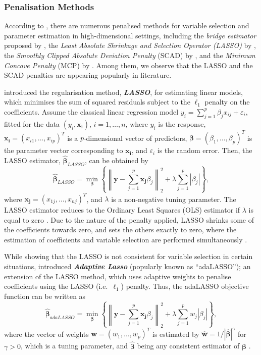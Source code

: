 \documentclass[11pt,a4paper,]{article}
\begin{document}
\hypertarget{penalisation-methods}{%
\subsubsection{Penalisation Methods}\label{penalisation-methods}}

According to \textcite{Huang2010}, there are numerous penalised methods
for variable selection and parameter estimation in high-dimensional
settings, including the \emph{bridge estimator} proposed by
\textcite{Frank1993}, the \emph{Least Absolute Shrinkage and Selection
Operator (LASSO)} by \textcite{Tibshirani1996}, the \emph{Smoothly
Clipped Absolute Deviation Penalty} (SCAD) by \textcite{Fan2001}, and
the \emph{Minimum Concave Penalty} (MCP) by \textcite{Zhang2010}. Among
them, we observe that the LASSO and the SCAD penalties are appearing
popularly in literature.

\textcite{Tibshirani1996} introduced the regularisation method,
\textbf{\emph{LASSO}}, for estimating linear models, which minimises the
sum of squared residuals subject to the \(\ell_{1}\) penalty on the
coefficients. Assume the classical linear regression model
\(y_{i} = \sum_{j=1}^{p} {\beta_{j}x_{ij}} +\varepsilon_{i}\), fitted
for the data \((y_{i}, \bm{x_{i}})\), \(i = 1, \dots, n\), where
\(y_{i}\) is the response, \(\bm{x_{i}} = (x_{i1}, \dots, x_{ip})^T\) is
a \(p\)-dimensional vector of predictors,
\(\bm{\beta} = (\beta_{1}, \dots, \beta_{p})^{T}\) is the parameter
vector corresponding to \(\bm{x_{i}}\), and \(\varepsilon_{i}\) is the
random error. Then, the LASSO estimator, \(\bm{\hat{\beta}}_{LASSO}\),
can be obtained by \[
 \bm{\hat{\beta}}_{LASSO} = \min_{\bm{\beta}}\left\{\left\lVert\bm{y} - \sum_{j=1}^{p} {\bm{x_{j}}\beta_{j}}\right\rVert_{2}^{2} + \lambda\sum_{j=1}^{p} {|\beta_{j}|}\right\},
\] where \(\bm{x_{j}} = \left (x_{1j}, \dots, x_{nj}\right )^{T}\), and
\(\lambda\) is a non-negative tuning parameter. The LASSO estimator
reduces to the Ordinary Least Squares (OLS) estimator if \(\lambda\) is
equal to zero \autocite{Konzen2016}. Due to the nature of the penalty
applied, LASSO shrinks some of the coefficients towards zero, and sets
the others exactly to zero, where the estimation of coefficients and
variable selection are performed simultaneously \autocite{Konzen2016}.

While showing that the LASSO is not consistent for variable selection in
certain situations, \textcite{Zou2006} introduced \textbf{\emph{Adaptive
Lasso}} (popularly known as ``adaLASSO''); an extension of the LASSO
method, which uses adaptive weights to penalise coefficients using the
LASSO (i.e.~\(\ell_{1}\)) penalty. Thus, the adaLASSO objective function
can be written as \[
 \bm{\hat{\beta}}_{adaLASSO} = \min_{\bm{\beta}}\left\{\left\lVert\bm{y} - \sum_{j=1}^{p} {\bm{x_{j}}\beta_{j}}\right\rVert_{2}^{2} + \lambda\sum_{j=1}^{p} {w_{j}|\beta_{j}|}\right\},
\] where the vector of weights
\(\bm{w} = \left (w_{1}, \dots, w_{p} \right )^{T}\) is estimated by
\(\bm{\hat{w}} = 1/|\bm{\hat{\beta}}|^{\gamma}\) for \(\gamma > 0\),
which is a tuning parameter, and \(\bm{\hat{\beta}}\) being any
consistent estimator of \(\bm{\beta}\) \autocite{Zou2006}.
\end{document}

